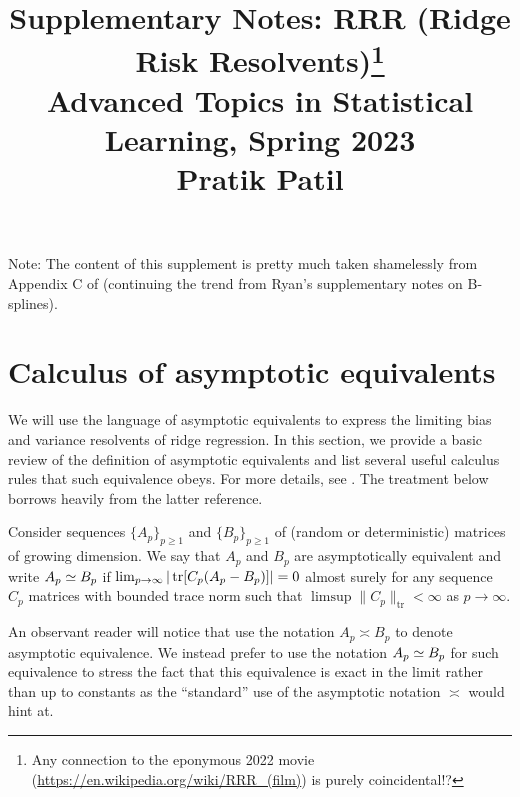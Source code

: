 \documentclass{article}
\title{Supplementary Notes: RRR (Ridge Risk Resolvents)\footnote{Any connection 
to the eponymous 2022 movie (\url{https://en.wikipedia.org/wiki/RRR_(film)}) 
is purely coincidental!?} \\ \smallskip
\large Advanced Topics in Statistical Learning, Spring 2023 \\ \smallskip
Pratik Patil}
\author{}
\date{}
\begin{document}
\maketitle
\RaggedRight
\vspace{-25pt}

Note: The content of this supplement is pretty much taken shamelessly 
from Appendix C of \cite{patil_2022}
(continuing the trend from Ryan's supplementary notes on B-splines).

\section{Calculus of asymptotic equivalents}
\label{sec:calculus_deterministic_equivalents}

We will use the language of asymptotic equivalents
to express the limiting bias and variance resolvents of ridge regression.
In this section, we provide a basic review of the definition
of asymptotic equivalents and list several useful calculus rules
that such equivalence obeys.
For more details, see \cite{dobriban_sheng_2021, patil_2022}.
The treatment below borrows heavily from the latter reference.


\begin{definition}
    \label{def:deterministic-equivalence}
    Consider sequences $\{ A_p \}_{p \ge 1}$ and $\{ B_p \}_{p \ge 1}$
    of (random or deterministic) matrices of growing dimension.
    We say that $A_p$ and $B_p$ are asymptotically equivalent and write
    $A_p \simeq B_p$ if
    $\lim_{p \to \infty} | \operatorname{tr}[C_p (A_p - B_p)] | = 0$ almost surely
    for any sequence $C_p$ matrices with bounded trace norm
    such that $\limsup \| C_p \|_{\mathrm{tr}} < \infty$
    as $p \to \infty$.
\end{definition}

An observant reader will notice that
\cite{dobriban_sheng_2021}
use the notation $A_p \asymp B_p$
to denote asymptotic equivalence.
We instead prefer to use the notation
$A_p \simeq B_p$ for such equivalence
to stress the fact that this equivalence
is exact in the limit rather than up to constants
as the ``standard'' use of the asymptotic notation
$\asymp$ would hint at.
\end{document}
